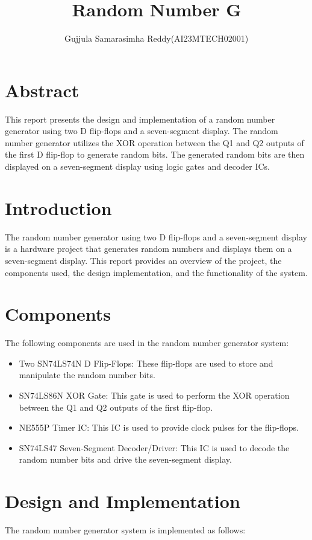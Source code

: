 \documentclass[journal,12pt,twocolumn]{IEEEtran}
\title{Random Number G}
\author{
   \author{ Gujjula Samarasimha Reddy(AI23MTECH02001)$^{}$}
}
\begin{document}
\maketitle

\section{Abstract}
This report presents the design and implementation of a random number generator using two D flip-flops and a seven-segment display. The random number generator utilizes the XOR operation between the Q1 and Q2 outputs of the first D flip-flop to generate random bits. The generated random bits are then displayed on a seven-segment display using logic gates and decoder ICs. 

\section{Introduction}
The random number generator using two D flip-flops and a seven-segment display is a hardware project that generates random numbers and displays them on a seven-segment display. This report provides an overview of the project, the components used, the design implementation, and the functionality of the system.

\section{Components}
The following components are used in the random number generator system:

\begin{itemize}
    \item Two SN74LS74N D Flip-Flops: These flip-flops are used to store and manipulate the random number bits.
    \item SN74LS86N XOR Gate: This gate is used to perform the XOR operation between the Q1 and Q2 outputs of the first flip-flop.
    \item NE555P Timer IC: This IC is used to provide clock pulses for the flip-flops.
    \item SN74LS47 Seven-Segment Decoder/Driver: This IC is used to decode the random number bits and drive the seven-segment display.
\end{itemize}

\section{Design and Implementation}
The random number generator system is implemented as follows:
\end{document}
